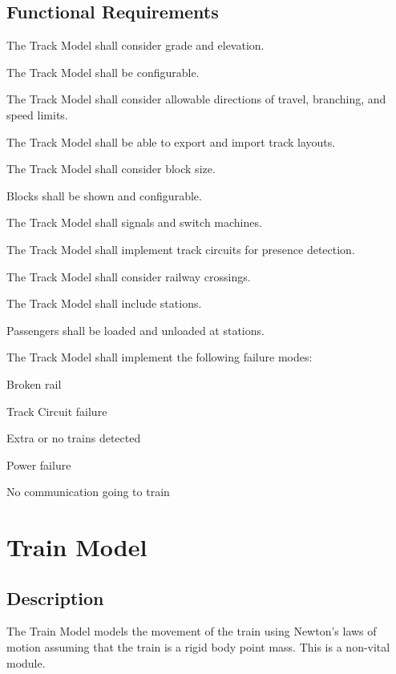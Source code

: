 \documentclass{scrreprt}
\begin{document}
\subsection{Functional Requirements}
\begin{numonly}
    \item The Track Model shall consider grade and elevation.
    \item The Track Model shall be configurable.
    \item The Track Model shall consider allowable directions of travel, branching, and speed limits.
    \item The Track Model shall be able to export and import track layouts.
    \item The Track Model shall consider block size.
    \begin{numonly}
        \item Blocks shall be shown and configurable.
    \end{numonly}
    \item The Track Model shall signals and switch machines.
    \item The Track Model shall implement track circuits for presence detection.
    \item The Track Model shall consider railway crossings.
    \item The Track Model shall include stations.
    \begin{numonly}
        \item Passengers shall be loaded and unloaded at stations.
    \end{numonly}
    \item The Track Model shall implement the following failure modes:
    \begin{numonly}
        \item Broken rail
        \item Track Circuit failure
        \item Extra or no trains detected
        \item Power failure
        \item No communication going to train
    \end{numonly}
\end{numonly}

\section{Train Model}

\subsection{Description}
The Train Model models the movement of the train using Newton's laws of motion
assuming that the train is a rigid body point mass. This is a non-vital module.
\end{document}
